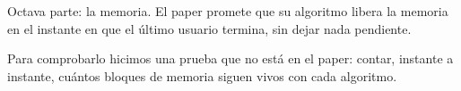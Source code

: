 Octava parte: la memoria. El paper promete que su algoritmo libera la memoria en el instante en que el último usuario termina, sin dejar nada pendiente.

Para comprobarlo hicimos una prueba que no está en el paper: contar, instante a instante, cuántos bloques de memoria siguen vivos con cada algoritmo.
